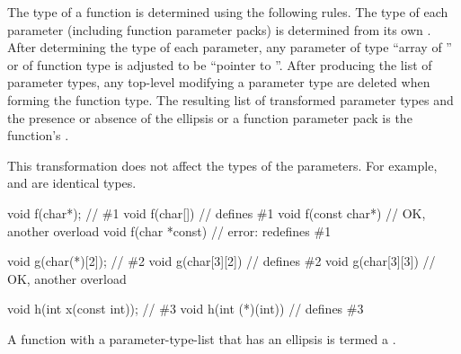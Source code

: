 \pnum
{}%
The type of a function is determined using the following rules.
The type of each parameter (including function parameter packs) is
determined from its own .
After determining the type of each parameter, any parameter
%
of type ``array of '' or
%
of function type 
is adjusted to be ``pointer to ''.
After producing the list of parameter types,
any top-level
modifying a parameter type are deleted
when forming the function type.
The resulting list of transformed parameter types
and the presence or absence of the ellipsis or a function parameter pack
is the function's
.
\begin{note}
This transformation does not affect the types of the parameters.
For example,  and
 are identical types.
\end{note}
\begin{example}
\begin{codeblock}
void f(char*);                  // \#1
void f(char[]) {}               // defines \#1
void f(const char*) {}          // OK, another overload
void f(char *const) {}          // error: redefines \#1

void g(char(*)[2]);             // \#2
void g(char[3][2]) {}           // defines \#2
void g(char[3][3]) {}           // OK, another overload

void h(int x(const int));       // \#3
void h(int (*)(int)) {}         // defines \#3
\end{codeblock}
\end{example}

\pnum
A function with a parameter-type-list that has an ellipsis
is termed a .

